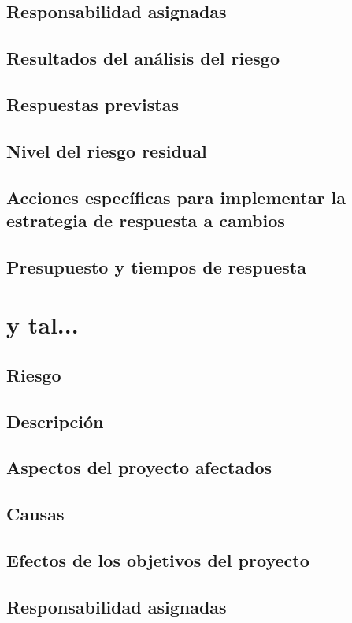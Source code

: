 \documentclass[11pt,a4paper,spanish,twoside]{report}
\begin{document}
\subsection{Responsabilidad asignadas}
\subsection{Resultados del análisis del riesgo}
\subsection{Respuestas previstas}
\subsection{Nivel del riesgo residual}
\subsection{Acciones específicas para implementar la estrategia de respuesta
a cambios}
\subsection{Presupuesto y tiempos de respuesta}

\section{y tal...}
\subsection{Riesgo}
\subsection{Descripción}
\subsection{Aspectos del proyecto afectados}
\subsection{Causas}
\subsection{Efectos de los objetivos del proyecto}
\subsection{Responsabilidad asignadas}
\end{document}
